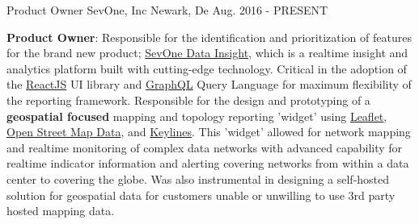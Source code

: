 \begin{cventries}
  \cventry
    {Product Owner}
    {SevOne, Inc}
    {Newark, De}
    {Aug. 2016 - PRESENT}
    {
      \begin{cvitems}
        \item{\textbf{Product Owner}: Responsible for the identification and prioritization of features for the brand new product; \href{https://www.sevone.com/sevone-data-insight}{SevOne Data Insight}, which is a realtime insight and analytics platform built with cutting-edge technology.  Critical in the adoption of the \href{http://reactjs.org}{ReactJS} UI library and \href{http://graphql.org}{GraphQL} Query Language for maximum flexibility of the reporting framework. Responsible for the design and prototyping of a \textbf{geospatial focused} mapping and topology reporting 'widget' using \href{http://www.leaflet.org}{Leaflet}, \href{http://www.openstreetmap.org}{Open Street Map Data}, and \href{http://www.keylines.com}{Keylines}.  This 'widget' allowed for network mapping and realtime monitoring of complex data networks with advanced capability for realtime indicator information and alerting covering networks from within a data center to covering the globe. Was also instrumental in designing a self-hosted solution for geospatial data for customers unable or unwilling to use 3rd party hosted mapping data.}
      \end{cvitems}
    }


\end{cventries}
